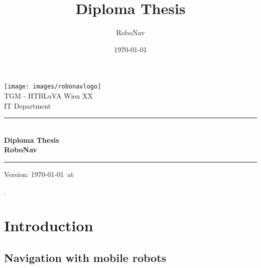 \documentclass[12pt]{article}
\title{Diploma Thesis}
\author{RoboNav}
\date{\today}
\begin{document}
\begin{titlepage}
\begin{center}

\texttt{[image: images/robonavlogo]}\\

\LARGE TGM - HTBLuVA Wien XX \\ IT Department  \\[1.5cm]

\rule{1.0\textwidth}{1mm}
{ \huge \bfseries \\[0.4cm]  \huge Diploma Thesis \\ \LARGE RoboNav \\[0.4cm] }

\rule{1.0\textwidth}{1mm}



\noindent 


\vfill

{\small Version: \today ~at  \thistime    }
\end{center}

\end{titlepage}


\ohead{\headmark}
\ofoot{\pagemark}

\newpage %
{\small\color{white}.}
\vspace{-0.7cm}
\tableofcontents

\newpage %

\newpage

\newpage

\newpage

\label{pageRomanEnd}

\newpage %
\ofoot{\pagemark}

\section{Introduction}
\label{sec:introduction}

\subsection{Navigation with mobile robots}
\label{subsec:stateoftheart}
%
\end{document}
